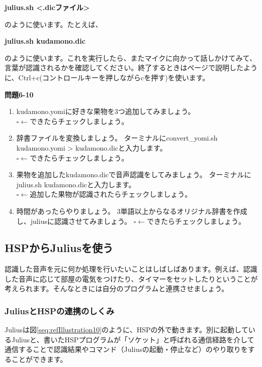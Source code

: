 \documentclass[a4paper,dvipdfmx]{jarticle}
\newcommand\liststyleLxiii{%
\renewcommand\theenumi{\arabic{enumi}}
\renewcommand\theenumii{\arabic{enumii}}
\renewcommand\theenumiii{\arabic{enumiii}}
\renewcommand\theenumiv{\arabic{enumiv}}
\renewcommand\labelenumi{\theenumi.}
\renewcommand\labelenumii{\theenumii.}
\renewcommand\labelenumiii{\theenumiii.}
\renewcommand\labelenumiv{\theenumiv.}
}
\begin{document}
{\ttfamily\bfseries
julius.sh {\textless}.dicファイル{\textgreater}}

{
のように使います。たとえば、}

{\ttfamily\bfseries
julius.sh kudamono.dic}

{
のように使います。これを実行したら、またマイクに向かって話しかけてみて、言葉が認識されるかを確認してください。終了するときは\pageref{bkm:RefHeadingToc20531017892532}ページで説明したように、Ctrl+c(コントロールキーを押しながらcを押す)を使います。}

{\bfseries
問題6-10}

\liststyleLxiii
\begin{enumerate}
\item {
kudamono.yomiに好きな果物を3つ追加してみましょう。\newline
${\square}\leftarrow
できたらチェックしましょう。$}
\item {
辞書ファイルを変換しましょう。\newline
ターミナルにconvert\_yomi.sh kudamono.yomi {\textgreater}
kudamono.dicと入力します。\newline
${\square}\leftarrow
できたらチェックしましょう。$}
\item {
果物を追加したkudamono.dicで音声認識をしてみましょう。\newline
ターミナルにjulius.sh
kudamono.dicと入力します。\newline
${\square}\leftarrow
追加した果物が認識されたらチェックしましょう。$}
\item {
時間があったらやりましょう。\newline
3単語以上からなるオリジナル辞書を作成し、juliusに認識させてみましょう。\newline
${\square}\leftarrow
できたらチェックしましょう。$}
\end{enumerate}
\subsection{HSPからJuliusを使う}
{
認識した音声を元に何か処理を行いたいことはしばしばあります。例えば、認識した音声に応じて部屋の電気をつけたり、タイマーをセットしたりということが考えられます。そんなときには自分のプログラムと連携させましょう。}

\subsubsection[JuliusとHSPの連携のしくみ]{JuliusとHSPの連携のしくみ}
{
Juliusは図\ref{seq:refIllustration10}のように、HSPの外で動きます。別に起動しているJuliusと、書いたHSPプログラムが「ソケット」と呼ばれる通信経路を介して通信することで認識結果やコマンド（Juliusの起動・停止など）のやり取りをすることができます。}
\end{document}
